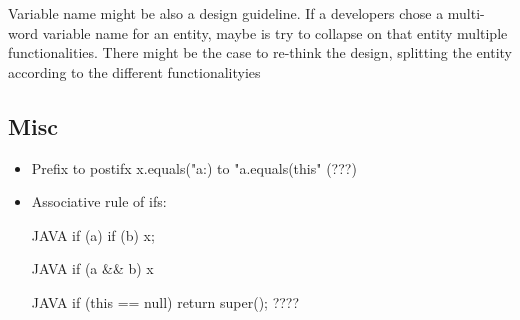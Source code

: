 Variable name might be also a design guideline. If a developers chose a multi-word variable name for an 
entity, maybe is try to collapse on that entity multiple functionalities. 
There might be the case to re-think the design, splitting the entity according to the different functionalityies 



\subsection{Misc}
\begin{itemize}
\item Prefix to postifx
x.equals("a:) to "a.equals(this" (???)


\item Associative rule of ifs: 
  \begin{code}{JAVA}
if (a) if (b) x;
\end{code}
  \begin{code}{JAVA}
if (a && b) x
  \end{code}
\begin{code}{JAVA}
if (this == null) return super();
????\end{code}
  
  \end{itemize}


